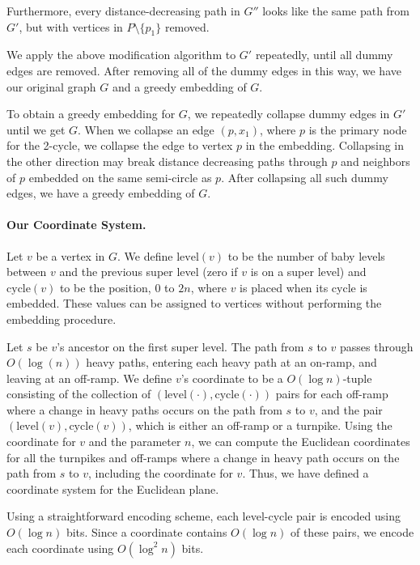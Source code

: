 \documentclass[11pt]{article}
\newcommand{\cycle}{\mathrm{cycle}}
\newcommand{\level}{\mathrm{level}}
\renewcommand{\subsection}[1]{\paragraph{#1.}}
\begin{document}
Furthermore, every distance-decreasing path in $G''$ looks like the same
path from $G'$, but with vertices in $P \setminus \{p_1\}$ removed.

We apply the above modification algorithm to $G'$ repeatedly, until all
dummy edges are removed. After removing all of the dummy edges in this
way, we have our original graph $G$ and a greedy embedding of $G$.

\else
To obtain a greedy embedding for $G$, we repeatedly collapse dummy edges
in $G'$ until we get $G$. When we collapse an edge $(p,x_1)$, 
where $p$ is the primary node for the 2-cycle, we collapse 
the edge to vertex $p$ in the embedding. Collapsing in the other
direction may break distance decreasing paths through $p$ and neighbors of $p$ 
embedded on the same semi-circle as $p$. After collapsing all such 
dummy edges, we have a greedy embedding of $G$.

\fi

\subsection{Our Coordinate System}
Let $v$ be a vertex in $G$. We define $\level(v)$ to be the number 
of baby levels between $v$ and the previous super level 
(zero if $v$ is on a super level) and $\cycle(v)$ to be the 
position, $0$ to $2n$, where $v$ is placed when its 
cycle is embedded. These values can be assigned to vertices
without performing the embedding procedure.

Let $s$ be $v$'s ancestor on the first super level. 
The path from $s$ to $v$ passes through $O(\log(n))$ heavy paths, entering
each heavy path at an on-ramp, and leaving at an off-ramp. 
We define $v$'s coordinate to be a $O(\log{n})$-tuple
consisting of the collection of $(\level(\cdot), \cycle(\cdot))$ pairs for each 
off-ramp where a change in heavy paths occurs on the path from $s$ to $v$, and the pair
$(\level(v),\cycle(v))$, which is either an off-ramp or a turnpike. 
Using the coordinate for $v$ and the parameter $n$, we can compute the
Euclidean coordinates for all the turnpikes and off-ramps where a change
in heavy path occurs on the path from $s$ to $v$, including the 
coordinate for $v$. Thus, we have defined a coordinate system for 
the Euclidean plane.

Using a straightforward encoding scheme, each level-cycle pair is encoded 
using $O(\log{n})$ bits. Since a coordinate contains $O(\log{n})$ of 
these pairs, we encode each coordinate using $O(\log^2{n})$ bits. 
\end{document}
